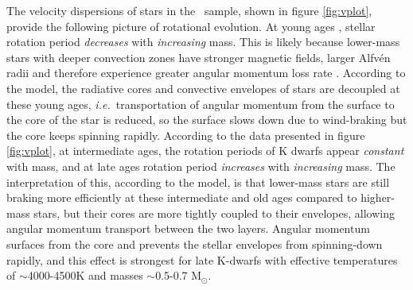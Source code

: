 \documentclass{aastex63}
\newcommand{\ie}{{\it i.e.}}
\newcommand{\eg}{{\it e.g.}}
\newcommand{\mct}{\citet{mcquillan2014}}
\newcommand{\racomment}[1]{{\color{black}#1}}
\begin{document}
The velocity dispersions of stars in the \mct\ sample, shown in figure
\ref{fig:vplot}, provide the following picture of rotational evolution.
\racomment{At young ages \citep[younger than around 1 Gyr but still old enough
to be on the main sequence and have transitioned from the `C' sequence to the
`I' sequence ][]{barnes2003}, stellar rotation period {\it decreases} with
{\it increasing} mass.}
This is likely because lower-mass stars with deeper
convection zones have stronger magnetic fields, larger Alfv\'en radii and
therefore experience greater angular momentum loss rate
\citep[\eg][]{schatzman1962, kraft1967, parker1970, kawaler1988,
charbonneau2010, matt2012, matt2015}.
According to the \citet{spada2019} model, the radiative cores and convective
envelopes of stars are decoupled at these young ages, \ie\ transportation of
angular momentum from the surface to the core of the star is reduced, so the
surface slows down due to wind-braking but the core keeps spinning rapidly.
According to the data presented in figure \ref{fig:vplot}, at intermediate
ages, the rotation periods of K dwarfs appear {\it constant} with mass, and at
late ages rotation period {\it increases} with {\it increasing} mass.
The interpretation of this, according to the \citet{spada2019} model, is that
lower-mass stars are still braking more efficiently at these intermediate and
old ages \racomment{compared to higher-mass stars,} but their cores are more
tightly coupled to their envelopes, allowing angular momentum transport
between the two layers.
Angular momentum surfaces \racomment{from the core} and prevents the stellar
envelopes from spinning-down rapidly, and this effect is strongest for late
K-dwarfs with effective temperatures of $\sim$4000-4500K and masses
$\sim$0.5-0.7 M$_\odot$.
\end{document}

